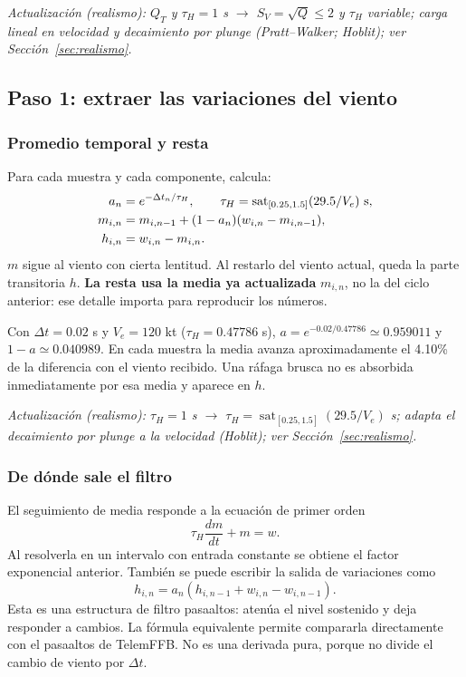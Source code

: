 \documentclass[11pt,a4paper]{article}
\newcommand{\code}[1]{\texttt{\detokenize{#1}}}
\newcommand{\sat}{\operatorname{sat}}
\begin{document}
\textit{Actualización (realismo): $Q_T$ y $\tau_H=1$ s $\rightarrow$ $S_V=\sqrt Q\le2$ y $\tau_H$ variable; carga lineal en velocidad y decaimiento por plunge (Pratt--Walker; Hoblit); ver Sección~\ref{sec:realismo}.}

\subsection{Paso 1: extraer las variaciones del viento}
\subsubsection{Promedio temporal y resta}
Para cada muestra y cada componente, \code{Model::update} calcula:
\begin{align}
a_n&=e^{-\Delta t_n/\tau_H},\qquad \tau_H=\sat_{[0.25,1.5]}(29.5/V_e)\ {\rm s},\\
m_{i,n}&=m_{i,n-1}+(1-a_n)(w_{i,n}-m_{i,n-1}),\\
h_{i,n}&=w_{i,n}-m_{i,n}.
\label{eq:turb-hp}
\end{align}
$m$ sigue al viento con cierta lentitud. Al restarlo del viento actual, queda la parte transitoria $h$. \textbf{La resta usa la media ya actualizada} $m_{i,n}$, no la del ciclo anterior: ese detalle importa para reproducir los números.

Con $\Delta t=0.02$ s y $V_e=120$ kt ($\tau_H=0.47786$ s), $a=e^{-0.02/0.47786}\simeq0.959011$ y $1-a\simeq0.040989$. En cada muestra la media avanza aproximadamente el 4.10\% de la diferencia con el viento recibido. Una ráfaga brusca no es absorbida inmediatamente por esa media y aparece en $h$.

\textit{Actualización (realismo): $\tau_H=1$ s $\rightarrow$ $\tau_H=\sat_{[0.25,1.5]}(29.5/V_e)$ s; adapta el decaimiento por plunge a la velocidad (Hoblit); ver Sección~\ref{sec:realismo}.}

\subsubsection{De dónde sale el filtro}
El seguimiento de media responde a la ecuación de primer orden
\begin{equation}
\tau_H\frac{dm}{dt}+m=w.
\end{equation}
Al resolverla en un intervalo con entrada constante se obtiene el factor exponencial anterior. También se puede escribir la salida de variaciones como
\begin{equation}
h_{i,n}=a_n(h_{i,n-1}+w_{i,n}-w_{i,n-1}).
\label{eq:turb-hp-equiv}
\end{equation}
Esta es una estructura de filtro pasaaltos: atenúa el nivel sostenido y deja responder a cambios. La fórmula equivalente permite compararla directamente con el pasaaltos de TelemFFB. No es una derivada pura, porque no divide el cambio de viento por $\Delta t$.
\end{document}

